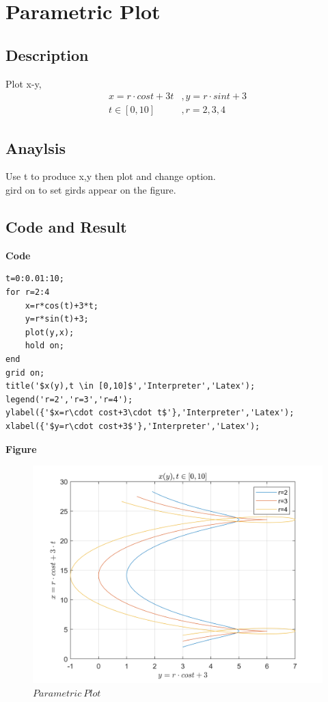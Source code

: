 \documentclass[UTF8,a4paper]{article}
\begin{document}
\section{Parametric Plot}
\subsection{Description}
Plot x-y,
$$
\begin{aligned}
    x=r\cdot cost+3t&,y=r\cdot sint+3\\
    t\in [0,10]&,r=2,3,4
\end{aligned}
$$

\subsection{Anaylsis}
\noindent Use t to produce x,y then plot and change option.\\
gird on to set girds appear on the figure.
\subsection{Code and Result}
\textbf{Code}
\begin{lstlisting}
t=0:0.01:10;
for r=2:4
    x=r*cos(t)+3*t;
    y=r*sin(t)+3;
    plot(y,x);
    hold on;
end
grid on;
title('$x(y),t \in [0,10]$','Interpreter','Latex');
legend('r=2','r=3','r=4');
ylabel({'$x=r\cdot cost+3\cdot t$'},'Interpreter','Latex');
xlabel({'$y=r\cdot cost+3$'},'Interpreter','Latex');
\end{lstlisting}
\newpage
\textbf{Figure}
\begin{figure}[h]
    \centering
    \includegraphics[width=1\textwidth]{T4-3.png}
    \caption{$Parametric~Plot$}
    \label{3}
\end{figure}
\end{document}
